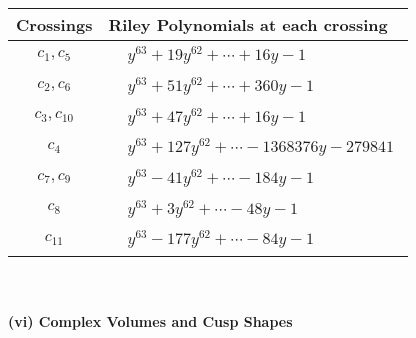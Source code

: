 \documentclass[1p]{elsarticle_modified}
\theoremstyle{definition}
\begin{document}
\begin{tabular}{m{50pt}|m{274pt}}
Crossings & \hspace{64pt}Riley Polynomials at each crossing \\
\hline $$\begin{aligned}c_{1},c_{5}\end{aligned}$$&$\begin{aligned}
&y^{63}+19 y^{62}+\cdots+16 y-1
\end{aligned}$\\
\hline $$\begin{aligned}c_{2},c_{6}\end{aligned}$$&$\begin{aligned}
&y^{63}+51 y^{62}+\cdots+360 y-1
\end{aligned}$\\
\hline $$\begin{aligned}c_{3},c_{10}\end{aligned}$$&$\begin{aligned}
&y^{63}+47 y^{62}+\cdots+16 y-1
\end{aligned}$\\
\hline $$\begin{aligned}c_{4}\end{aligned}$$&$\begin{aligned}
&y^{63}+127 y^{62}+\cdots-1368376 y-279841
\end{aligned}$\\
\hline $$\begin{aligned}c_{7},c_{9}\end{aligned}$$&$\begin{aligned}
&y^{63}-41 y^{62}+\cdots-184 y-1
\end{aligned}$\\
\hline $$\begin{aligned}c_{8}\end{aligned}$$&$\begin{aligned}
&y^{63}+3 y^{62}+\cdots-48 y-1
\end{aligned}$\\
\hline $$\begin{aligned}c_{11}\end{aligned}$$&$\begin{aligned}
&y^{63}-177 y^{62}+\cdots-84 y-1
\end{aligned}$\\
\hline
\end{tabular}\\~\\
\newpage\flushleft \textbf{(vi) Complex Volumes and Cusp Shapes}
\end{document}
